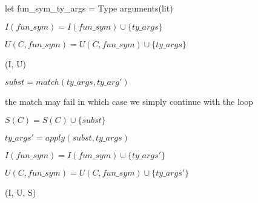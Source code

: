 \documentclass{article}
\begin{document}
\begin{algorithm}
\begin{algorithmic}[1]
         \State let fun\_sym\_ty\_args = Type arguments(lit)

            \State \(I(fun\_sym) = I(fun\_sym) \cup \{ty\_args\}\)

         \Else

            \State \(U(C, fun\_sym) = U(C, fun\_sym) \cup \{ty\_args\}\)

         \EndIf
         \EndFor
      \EndFor
   \EndFor

   \State \Return (I, U)

\EndFunction
\end{algorithmic}
\end{algorithm}


\begin{algorithm}
\begin{algorithmic}[1]
            
            \State \(subst = match(ty\_args, ty\_arg')\)

            \State \Comment the match may fail in which case we simply continue with the loop

            \State \(S(C) = S(C) \cup \{subst\}\)
         \EndFor
      \EndFor
   
   \EndFor

            \State \(ty\_args' = apply(subst, ty\_args)\)


               \State \(I(fun\_sym) = I(fun\_sym) \cup \{ty\_args'\}\)
            \Else

               \State \(U(C, fun\_sym) = U(C, fun\_sym) \cup \{ty\_args'\}\)
            \EndIf

         \EndFor
      \EndFor
   \EndFor

   \State \Return (I, U, S)

\EndFunction
\end{algorithmic}
\end{algorithm}
\end{document}
